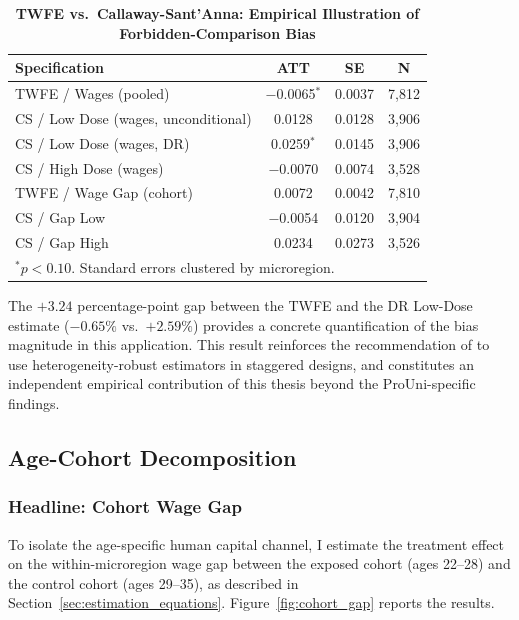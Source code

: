\begin{table}[ht]
\centering
\caption{\textbf{TWFE vs.\ Callaway-Sant'Anna: Empirical Illustration of Forbidden-Comparison Bias}}
\label{tab:twfe}
\begin{tabular}{lccc}
\hline
\textbf{Specification} & \textbf{ATT} & \textbf{SE} & \textbf{N} \\
\hline
TWFE / Wages (pooled)       & $-$0.0065$^{*}$ & 0.0037 & 7,812 \\
CS / Low Dose (wages, unconditional) & 0.0128 & 0.0128 & 3,906 \\
CS / Low Dose (wages, DR)   & 0.0259$^{*}$ & 0.0145 & 3,906 \\
CS / High Dose (wages)      & $-$0.0070 & 0.0074 & 3,528 \\
TWFE / Wage Gap (cohort)    & 0.0072 & 0.0042 & 7,810 \\
CS / Gap Low                & $-$0.0054 & 0.0120 & 3,904 \\
CS / Gap High               & 0.0234 & 0.0273 & 3,526 \\
\hline
\multicolumn{4}{l}{\small $^{*} p<0.10$. Standard errors clustered by microregion.}
\end{tabular}
\end{table}

The $+3.24$ percentage-point gap between the TWFE and the DR Low-Dose estimate ($-0.65\%$ vs.\ $+2.59\%$) provides a concrete quantification of the bias magnitude in this application. This result reinforces the recommendation of  to use heterogeneity-robust estimators in staggered designs, and constitutes an independent empirical contribution of this thesis beyond the ProUni-specific findings.

\subsection{Age-Cohort Decomposition}
\label{sec:cohort_results}

\subsubsection{Headline: Cohort Wage Gap}

To isolate the age-specific human capital channel, I estimate the treatment effect on the within-microregion wage gap between the exposed cohort (ages 22--28) and the control cohort (ages 29--35), as described in Section~\ref{sec:estimation_equations}. Figure~\ref{fig:cohort_gap} reports the results.

